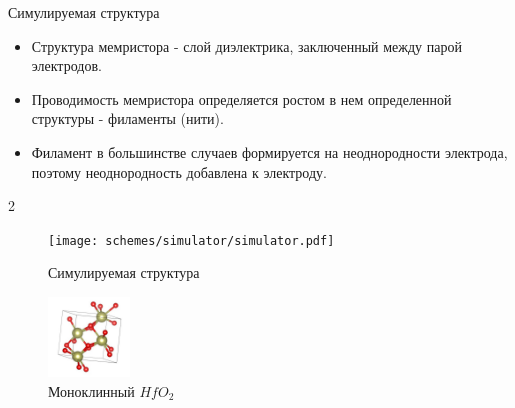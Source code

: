 \documentclass{beamer}%
\begin{document}
\begin{frame} {Симулируемая структура}
    \begin{itemize}
        \item Структура мемристора - слой диэлектрика, заключенный между парой электродов.
        \item Проводимость мемристора определяется ростом в нем определенной структуры - филаменты (нити).
        \item Филамент в большинстве случаев формируется на неоднородности электрода, поэтому неоднородность добавлена к электроду. \footnotemark[3]
    \end{itemize}

    \begin {multicols} {2}
    \begin{figure}
        \centering
        \texttt{[image: schemes/simulator/simulator.pdf]}
        \caption {Симулируемая структура}
    \end{figure}
    
    \columnbreak

    \begin{figure}
        \centering
        \includegraphics[height=80px]{img/POSCAR.jpg}
        \vspace {12px}
        \caption {Моноклинный \(HfO_2\)}
    \end{figure}

\end{multicols}


\end{frame}
\end{document}
